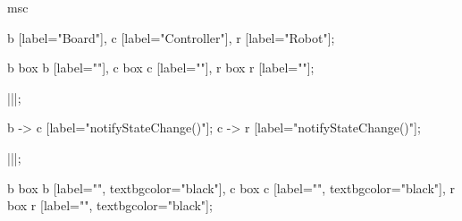 
\begin{msc}
msc
{

b [label="Board"],
c [label="Controller"],
r [label="Robot"];

b box b [label=""],
c box c [label=""],
r box r [label=""];

|||;

b -> c [label="notifyStateChange()"];
c -> r [label="notifyStateChange()"];

|||;

b box b [label="", textbgcolor="black"],
c box c [label="", textbgcolor="black"],
r box r [label="", textbgcolor="black"];

}
\end{msc}
